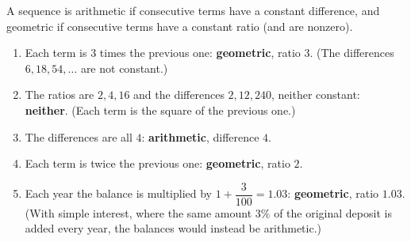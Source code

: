 A sequence is arithmetic if consecutive terms have a constant difference, and geometric if consecutive terms have a constant ratio (and are nonzero).
\begin{enumerate}
\item Each term is $3$ times the previous one: \textbf{geometric}, ratio $3$. (The differences $6,18,54,\dots$ are not constant.)
\item The ratios are $2,4,16$ and the differences $2,12,240$, neither constant: \textbf{neither}. (Each term is the square of the previous one.)
\item The differences are all $4$: \textbf{arithmetic}, difference $4$.
\item Each term is twice the previous one: \textbf{geometric}, ratio $2$.
\item Each year the balance is multiplied by $1+\dfrac{3}{100}=1.03$: \textbf{geometric}, ratio $1.03$. (With simple interest, where the same amount $3\%$ of the original deposit is added every year, the balances would instead be arithmetic.)
\end{enumerate}
